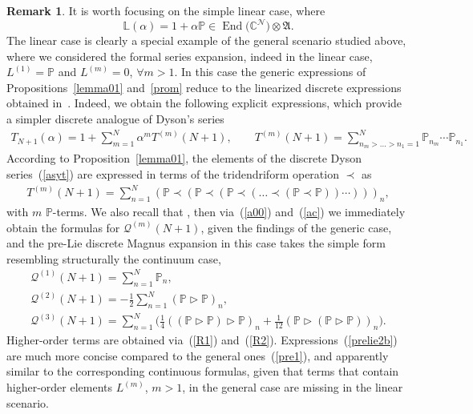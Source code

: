 \documentclass[pdftex]{sigma}
\numberwithin{equation}{section}
\theoremstyle{definition}
\newtheorem{rem}[thm]{Remark}
\DeclareMathOperator{\EEnd}{End}%
\begin{document}
\begin{rem}{\label{remark12}} It is worth focusing on the simple linear case, where
\[
{\mathbb L}(\alpha) = 1 + \alpha {\mathbb P} \in \EEnd\bigl({\mathbb C}^{\mathcal N}\bigr) \otimes {\mathfrak A}.
\]
The linear case is clearly a special example of the general scenario studied above, where we considered the formal series expansion, \smash{${\mathbb L}(\alpha) =1 + \sum_{m=1}^{\infty}\alpha^m L^{(m)} \in \EEnd\bigl({\mathbb C}^{\mathcal N}\bigr) \otimes {\mathfrak A};$} indeed in the linear case, $L^{(1)} = {\mathbb P}$ and $L^{(m)} =0$, $\forall m>1$. In this case the generic expressions of Propositions~\ref{lemma01} and~\ref{prom} reduce to the linearized discrete expressions obtained in~\cite{EbraMan}.
Indeed, we obtain the following explicit expressions, which provide a simpler discrete analogue of Dyson's series
\begin{gather}
T_{N+1}(\alpha) = 1 + \sum_{m=1}^N\alpha^{m} T^{(m)}(N+1), \qquad T^{(m)}(N+1) =
\sum_{n_m>\dots>n_1=1}^{N} {\mathbb P}_{n_m} \cdots {\mathbb P}_{n_1}. \label{asyt}
\end{gather}
According to Proposition~\ref{lemma01}, the elements of the discrete Dyson series~(\ref{asyt})
are expressed in terms of the tridendriform operation $\prec $ as
\begin{gather}
T^{(m)}(N+1) = \sum_{n =1}^N ({\mathbb P}\prec ({\mathbb P}\prec
({\mathbb P} \prec (\dots \prec({\mathbb P} \prec {\mathbb P})) \cdots )) )_n, \label{dendr1}
\end{gather}
with $m$ ${\mathbb P}$-terms. We also recall that , then via~(\ref{a00}) and~(\ref{ac})
we immediately obtain the formulas for ${\mathcal Q}^{(m)}(N+1)$, given the findings of the generic case,
and the pre-Lie discrete Magnus expansion in this case takes the simple form resembling structurally the continuum case,
\begin{gather}
 {\mathcal Q}^{(1)}(N+1) = \sum_{n=1}^N{\mathbb P}_n, \\
 {\mathcal Q}^{(2)}(N+1) =-\frac{1}{2} \sum_{n=1}^N ( {\mathbb P} \triangleright {\mathbb P})_n, \nonumber\\
 {\mathcal Q}^{(3)}(N+1)= \sum_{n=1}^N\biggl(
\frac{1}{4} (({\mathbb P} \triangleright {\mathbb P}) \triangleright {\mathbb P} )_n + \frac{1}{12} ({\mathbb P} \triangleright ({\mathbb P} \triangleright {\mathbb P}) )_n \biggr).\label{prelie2b}
\end{gather}
Higher-order terms are obtained via~(\ref{R1}) and~(\ref{R2}). Expressions~(\ref{prelie2b}) are much more concise compared to the general ones~(\ref{pre1}), and apparently similar to the corresponding continuous formulas,
given that {terms that contain higher-order elements $L^{(m)}$, $m>1$, in the general case} are missing in the linear scenario.
\end{rem}
\end{document}
